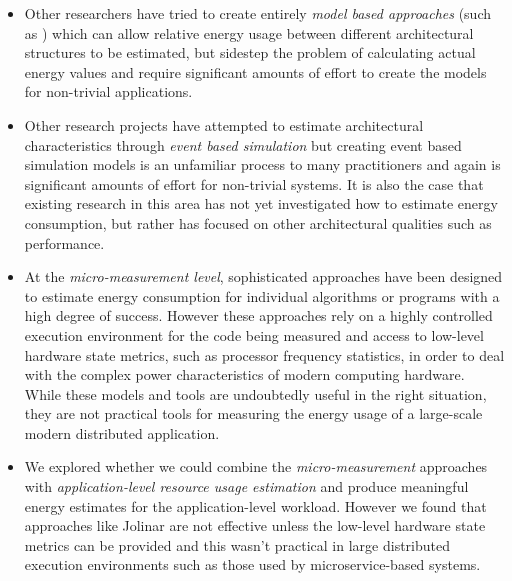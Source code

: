 \begin{itemize}
\item Other researchers have tried to create entirely \emph{model based approaches} (such as \cite{seo2008-energystyle}) which can allow relative energy usage between different architectural structures to be estimated, but sidestep the problem of calculating actual energy values and require significant amounts of effort to create the models for non-trivial applications.

\item Other research projects have attempted to estimate architectural characteristics through \emph{event based simulation} \cite{grahn1998-energystyles} but creating event based simulation models is an unfamiliar process to many practitioners and again is significant amounts of effort for non-trivial systems.  It is also the case that existing research in this area has not yet investigated how to estimate energy consumption, but rather has focused on other architectural qualities such as performance.

\item At the \emph{micro-measurement level}, sophisticated approaches have been designed to estimate energy consumption for individual algorithms or programs \cite{noureddine2016-jolinar} with a high degree of success.  However these approaches rely on a highly controlled execution environment for the code being measured and access to low-level hardware state metrics, such as processor frequency statistics, in order to deal with the complex power characteristics of modern computing hardware.  While these models and tools are undoubtedly useful in the right situation, they are not practical tools for measuring the energy usage of a large-scale modern distributed application.

\item We explored whether we could combine the \emph{micro-measurement} approaches with \emph{application-level resource usage estimation} and produce meaningful energy estimates for the application-level workload.  However we found that approaches like Jolinar are not effective unless the low-level hardware state metrics can be provided and this wasn't practical in large distributed execution environments such as those used by microservice-based systems.

\end{itemize}

